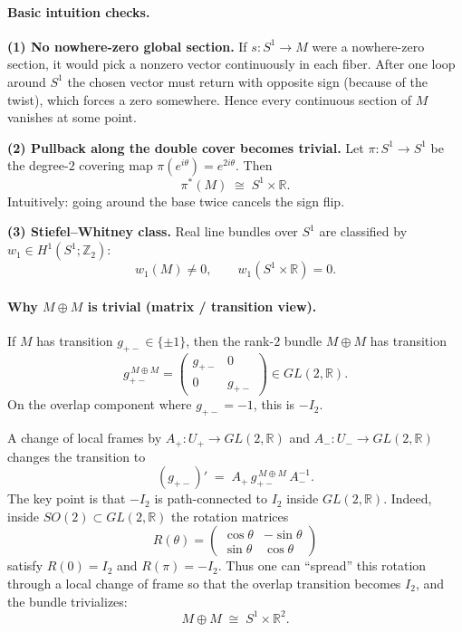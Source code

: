 \documentclass[12pt,a4paper]{article}
\theoremstyle{plain}
\theoremstyle{definition}      %
\begin{document}
\paragraph{Basic intuition checks.}

\textbf{(1) No nowhere-zero global section.}
If $s:S^1\to M$ were a nowhere-zero section, it would pick a nonzero vector
continuously in each fiber. After one loop around $S^1$ the chosen vector must
return with opposite sign (because of the twist), which forces a zero somewhere.
Hence every continuous section of $M$ vanishes at some point.

\textbf{(2) Pullback along the double cover becomes trivial.}
Let $\pi:S^1\to S^1$ be the degree-$2$ covering map $\pi(e^{i\theta})=e^{2i\theta}$.
Then
\[
\pi^*(M)\;\cong\; S^1\times \mathbb{R}.
\]
Intuitively: going around the base twice cancels the sign flip.

\textbf{(3) Stiefel--Whitney class.}
Real line bundles over $S^1$ are classified by $w_1\in H^1(S^1;\mathbb{Z}_2)$:
\[
w_1(M)\neq 0,\qquad w_1(S^1\times \mathbb{R})=0.
\]

\paragraph{Why $M\oplus M$ is trivial (matrix / transition view).}
If $M$ has transition $g_{+-}\in\{\pm 1\}$, then the rank-$2$ bundle $M\oplus M$
has transition
\[
g_{+-}^{\,M\oplus M}=
\begin{pmatrix}
	g_{+-} & 0\\[2pt]
	0 & g_{+-}
\end{pmatrix}
\in GL(2,\mathbb{R}).
\]
On the overlap component where $g_{+-}=-1$, this is $-I_2$.

A change of local frames by $A_+:U_+\to GL(2,\mathbb{R})$ and
$A_-:U_-\to GL(2,\mathbb{R})$ changes the transition to
\[
(g_{+-})' \;=\; A_+\, g_{+-}^{\,M\oplus M}\, A_-^{-1}.
\]
The key point is that $-I_2$ is path-connected to $I_2$ inside $GL(2,\mathbb{R})$.
Indeed, inside $SO(2)\subset GL(2,\mathbb{R})$ the rotation matrices
\[
R(\theta)=
\begin{pmatrix}
	\cos\theta & -\sin\theta\\
	\sin\theta & \cos\theta
\end{pmatrix}
\]
satisfy $R(0)=I_2$ and $R(\pi)=-I_2$. Thus one can ``spread'' this rotation
through a local change of frame so that the overlap transition becomes $I_2$,
and the bundle trivializes:
\[
M\oplus M \;\cong\; S^1\times \mathbb{R}^2.
\]
\end{document}
